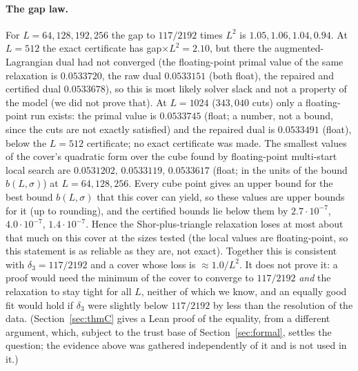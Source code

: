 \documentclass[11pt]{amsart}
\theoremstyle{remark}
\begin{document}
\paragraph{The gap law.}
For $L=64,128,192,256$ the gap to $117/2192$ times $L^2$ is $1.05,1.06,1.04,0.94$. At $L=512$ the exact certificate has gap$\times L^2=2.10$, but there the augmented-Lagrangian dual had not converged (the floating-point primal value of the same relaxation is $0.0533720$, the
raw dual $0.0533151$ (both float), the repaired and certified dual $0.0533678$), so this is most likely solver slack and not a property of the model (we did not prove that). At $L=1024$ ($343{,}040$ cuts) only a floating-point run exists: the primal value is $0.0533745$ (float; a number, not a bound, since the cuts are not exactly satisfied) and the repaired dual is $0.0533491$ (float), below the $L=512$ certificate; no exact certificate was made.
The smallest values of the cover's quadratic form over the cube found by floating-point multi-start local search are $0.0531202,\,0.0533119,\,0.0533617$ (float; in the units of the bound $b(L,\sigma)$) at $L=64,128,256$. Every cube point gives an upper bound for the best bound $b(L,\sigma)$ that this cover can yield, so these values are upper bounds for it (up to rounding), and the certified bounds lie below them by $2.7\cdot10^{-7}$, $4.0\cdot10^{-7}$, $1.4\cdot10^{-7}$. Hence the Shor-plus-triangle relaxation loses at most about that much on this cover at the sizes tested (the local values are floating-point, so this statement is as reliable as they are, not exact).
Together this is consistent with $\delta_3=117/2192$ and a cover whose loss is $\approx1.0/L^2$. It does not prove it: a proof would need the minimum of the cover to converge to $117/2192$ \emph{and} the relaxation to stay tight for all $L$, neither of which we know, and an equally good fit would hold if $\delta_3$ were slightly below $117/2192$ by less than the resolution of the data. (Section~\ref{sec:thmC} gives a Lean proof of the equality, from a different argument, which, subject to the trust base of Section~\ref{sec:formal}, settles the question; the evidence above was gathered independently of it and is not used in it.)
\end{document}
